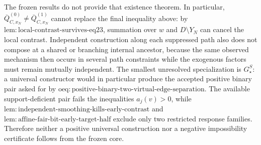 The frozen results do not provide that existence theorem. In particular, \(\overline Q^{(0)}_{C,x_N}\ne\overline Q^{(1)}_{C,x_N}\) cannot replace the final inequality above: by \(\mathrm{lem:local\text{-}contrast\text{-}survives\text{-}eq23}\), summation over \(w\) and \(D\setminus Y_N\) can cancel the local contrast. Independent construction along each suppressed path also does not compose at a shared or branching internal ancestor, because the same observed mechanism then occurs in several path constraints while the exogenous factors must remain mutually independent. The smallest unresolved specialization is \(G_\star^S\): a universal constructor would in particular produce the accepted positive binary pair asked for by \(\mathrm{oeq:positive\text{-}binary\text{-}two\text{-}virtual\text{-}edge\text{-}separation}\). The available support-deficient pair fails the inequalities \(a_j(v)>0\), while \(\mathrm{lem:independent\text{-}smoothing\text{-}kills\text{-}early\text{-}contrast}\) and \(\mathrm{lem:affine\text{-}fair\text{-}bit\text{-}early\text{-}target\text{-}half}\) exclude only two restricted response families. Therefore neither a positive universal construction nor a negative impossibility certificate follows from the frozen core.